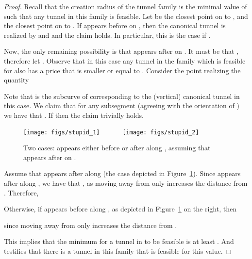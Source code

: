 \documentclass[12pt]{article}
\providecommand{\si}[1]{#1}
\newcommand{\figlab}[1]{\label{fig:#1}}
\newcommand{\figref}[1]{Figure~\ref{fig:#1}}
\newcommand{\tunnel}{tunnel\xspace}
\numberwithin{figure}{section}
\numberwithin{equation}{section}
\begin{document}
\begin{proof}
    Recall that the creation radius of the \tunnel family is the
    minimal value of  such that any \tunnel in this family is
    feasible. Let  be the closest point on  to , and
     the closest point on  to .  If  appears
    before  on , then the canonical \tunnel is realized by
     and  and the claim holds. In
    particular, this is the case if .
    
    Now, the only remaining possibility is that  appears after
     on . It must be that , therefore let
    .  Observe that in this case any \tunnel in
    the family which is feasible for  also has a price that is
    smaller or equal to .
Consider the point  realizing the quantity
    
    Note that  is the subcurve of  corresponding to the
    (vertical) canonical \tunnel in this case.  We claim that for any
    subsegment  (agreeing with the
    orientation of ) we have that .  If  then the claim trivially
    holds.
    
    \begin{figure}[\si{tb}]\center
        \texttt{[image: figs/stupid\_1]}
        ~~~~~~\texttt{[image: figs/stupid\_2]}
        \caption{Two cases:  appears either before or after 
           along , assuming that  appears after  on
           .}
        \figlab{stupid}
    \end{figure}
    
    Assume that  appears after  along  (the case
    depicted in \figref{stupid}). Since  appears after  along
    , we have that , as
    moving away from  only increases the distance from
    . Therefore,
    
    
    Otherwise, if  appears before  along , as depicted
    in \figref{stupid} on the right, then
    
    since moving away from  only increases the distance from .
    
    This implies that the minimum  for a \tunnel in
     to be feasible is at least
    .  And
     testifies that there is a \tunnel in this family that is
    feasible for this value.
\end{proof}
\end{document}
